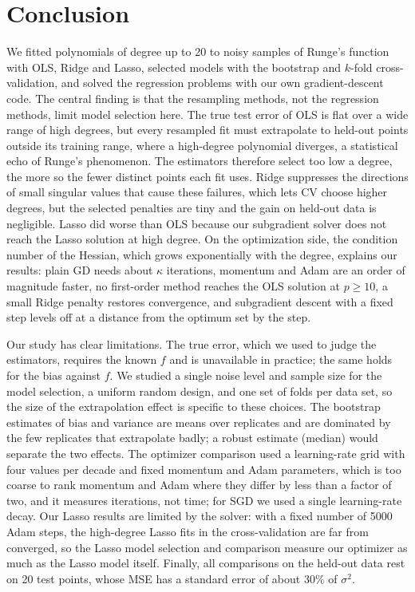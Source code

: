 \section{Conclusion}\label{sec:conclusion}

We fitted polynomials of degree up to 20 to noisy samples of Runge's function
with OLS, Ridge and Lasso, selected models with the bootstrap and $k$-fold
cross-validation, and solved the regression problems with our own
gradient-descent code. The central finding is that the resampling methods, not
the regression methods, limit model selection here. The true test error of OLS
is flat over a wide range of high degrees, but every resampled fit must
extrapolate to held-out points outside its training range, where a high-degree
polynomial diverges, a statistical echo of Runge's phenomenon. The estimators
therefore select too low a degree, the more so the fewer distinct points each
fit uses. Ridge suppresses the directions of small singular values that cause
these failures, which lets CV choose higher degrees, but the selected penalties
are tiny and the gain on held-out data is negligible. Lasso did worse than OLS
because our subgradient solver does not reach the Lasso solution at high
degree. On the optimization side, the condition number of the Hessian, which
grows exponentially with the degree, explains our results: plain GD needs about
$\kappa$ iterations, momentum and Adam are an order of magnitude faster, no
first-order method reaches the OLS solution at $p\geq10$, a small Ridge penalty
restores convergence, and subgradient descent with a fixed step levels off at a
distance from the optimum set by the step.

Our study has clear limitations. The true error, which we used to judge the
estimators, requires the known $f$ and is unavailable in practice; the same
holds for the bias against $f$. We studied a single noise level and sample
size for the model selection, a uniform random design, and one set of folds per
data set, so the size of the extrapolation effect is specific to these
choices. The bootstrap estimates of bias and
variance are means over replicates and are dominated by the few replicates that
extrapolate badly; a robust estimate (median) would separate the two effects.
The optimizer comparison used a learning-rate grid with four values per decade
and fixed momentum and Adam parameters, which is too coarse to rank momentum
and Adam where they differ by less than a factor of two, and it measures
iterations, not time; for SGD we used a single learning-rate decay. Our Lasso results are limited by the solver: with a fixed
number of 5000 Adam steps, the high-degree Lasso fits in the cross-validation
are far from converged, so the Lasso model selection and comparison measure our
optimizer as much as the Lasso model itself. Finally,
all comparisons on the held-out data rest on 20 test points, whose MSE has a
standard error of about $30\%$ of $\sigma^2$.

